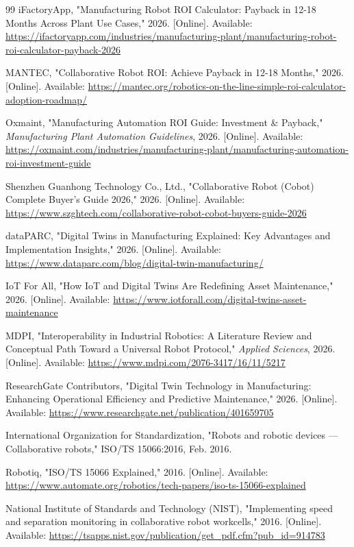 \begin{thebibliography}{99}
 iFactoryApp, "Manufacturing Robot ROI Calculator: Payback in 12-18 Months Across Plant Use Cases," 2026. [Online]. Available: \url{https://ifactoryapp.com/industries/manufacturing-plant/manufacturing-robot-roi-calculator-payback-2026}

 MANTEC, "Collaborative Robot ROI: Achieve Payback in 12-18 Months," 2026. [Online]. Available: \url{https://mantec.org/robotics-on-the-line-simple-roi-calculator-adoption-roadmap/}

 Oxmaint, "Manufacturing Automation ROI Guide: Investment \& Payback," \textit{Manufacturing Plant Automation Guidelines}, 2026. [Online]. Available: \url{https://oxmaint.com/industries/manufacturing-plant/manufacturing-automation-roi-investment-guide}

 Shenzhen Guanhong Technology Co., Ltd., "Collaborative Robot (Cobot) Complete Buyer's Guide 2026," 2026. [Online]. Available: \url{https://www.szghtech.com/collaborative-robot-cobot-buyers-guide-2026}

 dataPARC, "Digital Twins in Manufacturing Explained: Key Advantages and Implementation Insights," 2026. [Online]. Available: \url{https://www.dataparc.com/blog/digital-twin-manufacturing/}

 IoT For All, "How IoT and Digital Twins Are Redefining Asset Maintenance," 2026. [Online]. Available: \url{https://www.iotforall.com/digital-twins-asset-maintenance}

 MDPI, "Interoperability in Industrial Robotics: A Literature Review and Conceptual Path Toward a Universal Robot Protocol," \textit{Applied Sciences}, 2026. [Online]. Available: \url{https://www.mdpi.com/2076-3417/16/11/5217}

 ResearchGate Contributors, "Digital Twin Technology in Manufacturing: Enhancing Operational Efficiency and Predictive Maintenance," 2026. [Online]. Available: \url{https://www.researchgate.net/publication/401659705}

 International Organization for Standardization, "Robots and robotic devices — Collaborative robots," ISO/TS 15066:2016, Feb. 2016.

 Robotiq, "ISO/TS 15066 Explained," 2016. [Online]. Available: \url{https://www.automate.org/robotics/tech-papers/iso-ts-15066-explained}

 National Institute of Standards and Technology (NIST), "Implementing speed and separation monitoring in collaborative robot workcells," 2016. [Online]. Available: \url{https://tsapps.nist.gov/publication/get_pdf.cfm?pub_id=914783}

\end{thebibliography}
